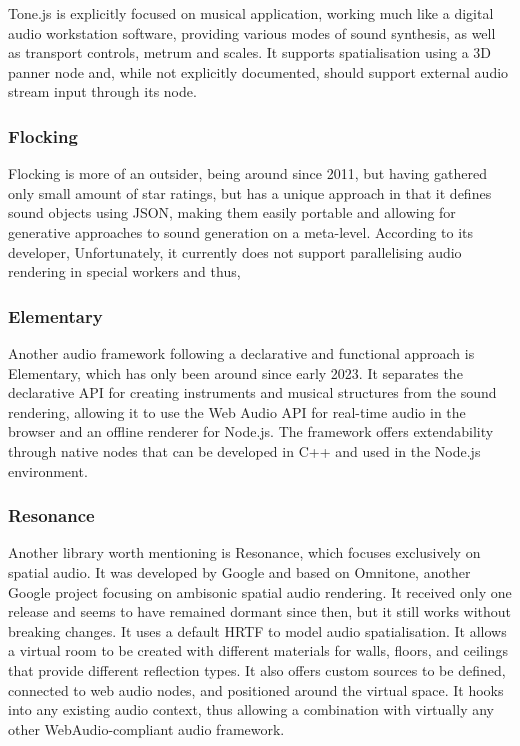 Tone.js is explicitly focused on musical application, working much like a digital audio workstation software, providing various modes of sound synthesis, as well as transport controls, metrum and scales. It supports spatialisation using a \ac{3D} panner node and, while not explicitly documented, should support external audio stream input through its  node.

\subsubsection{Flocking}

Flocking is more of an outsider, being around since 2011, but having gathered only small amount of star ratings, but has a unique approach in that it defines sound objects using \ac{JSON}, making them easily portable and allowing for generative approaches to sound generation on a meta-level. According to its developer,  Unfortunately, it currently does not support parallelising audio rendering in special workers and thus, 

\subsubsection{Elementary}

Another audio framework following a declarative and functional approach is Elementary, which has only been around since early 2023. It separates the declarative \ac{API} for creating instruments and musical structures from the sound rendering, allowing it to use the Web Audio \ac{API} for real-time audio in the browser and an offline renderer for Node.js. The framework offers extendability through native nodes that can be developed in C++ and used in the Node.js environment.

\subsubsection{Resonance}

Another library worth mentioning is Resonance, which focuses exclusively on spatial audio. It was developed by Google and based on Omnitone, another Google project focusing on ambisonic spatial audio rendering. It received only one release and seems to have remained dormant since then, but it still works without breaking changes. It uses a default \ac{HRTF} to model audio spatialisation. It allows a virtual room to be created with different materials for walls, floors, and ceilings that provide different reflection types. It also offers custom sources to be defined, connected to web audio nodes, and positioned around the virtual space. It hooks into any existing audio context, thus allowing a combination with virtually any other WebAudio-compliant audio framework.


